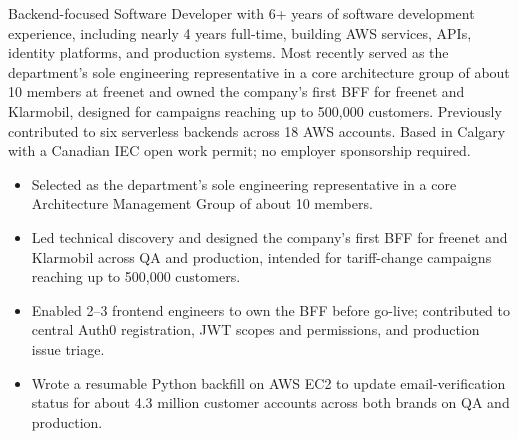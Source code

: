 \documentclass[10pt,letterpaper]{article}
\begin{document}
\resumeheader

\vspace{2.5mm}
\fontsize{9.7pt}{12pt}\selectfont

Backend-focused Software Developer with 6+ years of software development experience, including nearly 4 years full-time, building AWS services, APIs, identity platforms, and production systems. Most recently served as the department's sole engineering representative in a core architecture group of about 10 members at freenet and owned the company's first BFF for freenet and Klarmobil, designed for campaigns reaching up to 500,000 customers. Previously contributed to six serverless backends across 18 AWS accounts. Based in Calgary with a Canadian IEC open work permit; no employer sponsorship required.

\begin{itemize}
\end{itemize}

\begin{itemize}
  \item Selected as the department's sole engineering representative in a core Architecture Management Group of about 10 members.
  \item Led technical discovery and designed the company's first BFF for freenet and Klarmobil across QA and production, intended for tariff-change campaigns reaching up to 500,000 customers.
  \item Enabled 2--3 frontend engineers to own the BFF before go-live; contributed to central Auth0 registration, JWT scopes and permissions, and production issue triage.
  \item Wrote a resumable Python backfill on AWS EC2 to update email-verification status for about 4.3 million customer accounts across both brands on QA and production.
\end{itemize}
\end{document}
